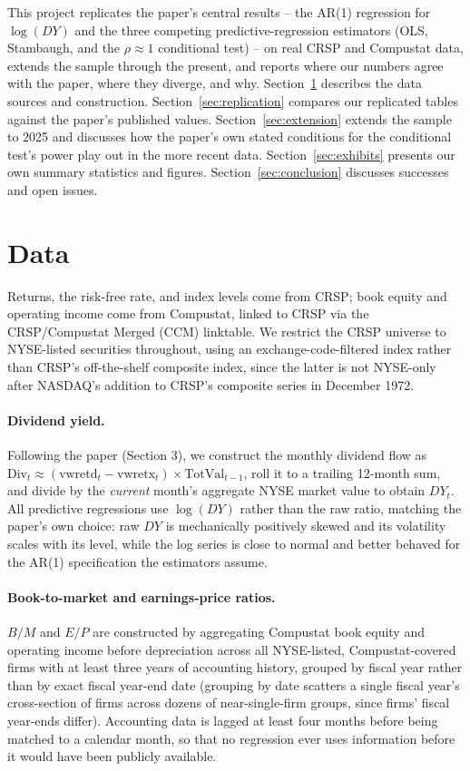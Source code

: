\documentclass[11pt]{article}
\begin{document}
This project replicates the paper's central results -- the AR(1) regression
for \(\log(DY)\) and the three competing predictive-regression estimators
(OLS, Stambaugh, and the \(\rho \approx 1\) conditional test) -- on real
CRSP and Compustat data, extends the sample through the present, and
reports where our numbers agree with the paper, where they diverge, and
why. Section~\ref{sec:data} describes the data sources and construction.
Section~\ref{sec:replication} compares our replicated tables against the
paper's published values. Section~\ref{sec:extension} extends the sample to
2025 and discusses how the paper's own stated conditions for the
conditional test's power play out in the more recent data.
Section~\ref{sec:exhibits} presents our own summary statistics and figures.
Section~\ref{sec:conclusion} discusses successes and open issues.

\section{Data}
\label{sec:data}

Returns, the risk-free rate, and index levels come from CRSP; book equity
and operating income come from Compustat, linked to CRSP via the CRSP/Compustat
Merged (CCM) linktable. We restrict the CRSP universe to NYSE-listed
securities throughout, using an exchange-code-filtered index rather than
CRSP's off-the-shelf composite index, since the latter is not NYSE-only
after NASDAQ's addition to CRSP's composite series in December 1972.

\paragraph{Dividend yield.} Following the paper (Section 3), we construct
the monthly dividend flow as \(\text{Div}_t \approx (\text{vwretd}_t -
\text{vwretx}_t) \times \text{TotVal}_{t-1}\), roll it to a trailing
12-month sum, and divide by the \emph{current} month's aggregate NYSE
market value to obtain \(DY_t\). All predictive regressions use
\(\log(DY)\) rather than the raw ratio, matching the paper's own choice:
raw \(DY\) is mechanically positively skewed and its volatility scales with
its level, while the log series is close to normal and better behaved for
the AR(1) specification the estimators assume.

\paragraph{Book-to-market and earnings-price ratios.} \(B/M\) and \(E/P\)
are constructed by aggregating Compustat book equity and operating income
before depreciation across all NYSE-listed, Compustat-covered firms with at
least three years of accounting history, grouped by fiscal year rather than
by exact fiscal year-end date (grouping by date scatters a single fiscal
year's cross-section of firms across dozens of near-single-firm groups,
since firms' fiscal year-ends differ). Accounting data is lagged at least
four months before being matched to a calendar month, so that no regression
ever uses information before it would have been publicly available.
\end{document}
